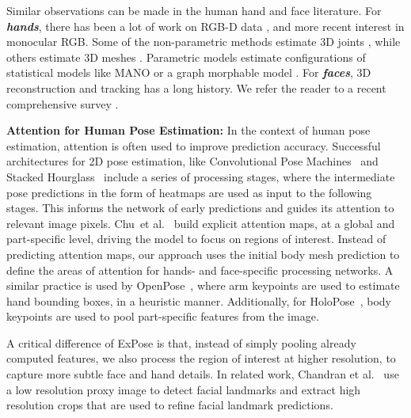\documentclass[runningheads]{llncs}
\newcommand{\modelname}{\mbox{ExPose}\xspace}
\newcommand{\mano}{\mbox{MANO}\xspace}
\newcommand{\threeD}{3D\xspace}
\newcommand{\etal}{et al.\xspace}
\newcommand{\rgb}{\mbox{RGB}\xspace}
\newcommand{\rgbD}{\mbox{RGB-D}\xspace}
\newcommand{\labelBODY}[1]{\xspace{\color{black} \textbf{\emph{#1}}}\xspace}
\begin{document}
Similar observations can be made in the human hand and face literature.
For \labelBODY{hands}, there has been a lot of work on \rgbD data
\cite{yuan2018depth}, and more recent interest in
monocular \rgb \cite{Baek_2019_CVPR,boukhayma_2019_cvpr,honnotate2020,hasson_2019_cvpr,Iqbal_2018_ECCV,kulon2019rec,Mueller_2018_GANerated,Tekin_2019_CVPR,brox_ICCV_2017}.
Some of the non-parametric methods estimate \threeD joints \cite{Iqbal_2018_ECCV,Mueller_2018_GANerated,Tekin_2019_CVPR,brox_ICCV_2017},
while others estimate \threeD meshes \cite{Ge_2019_CVPR,Kulon_2020_CVPR}.
Parametric models \cite{Baek_2019_CVPR,boukhayma_2019_cvpr,hasson_2019_cvpr,kulon2019rec,Zhang_2019_ICCV}
estimate configurations of statistical models like \mano \cite{romero2017embodied}
or a graph morphable model \cite{kulon2019rec}.
For \labelBODY{faces}, \threeD reconstruction and tracking
has a long history. We refer the reader to a recent comprehensive
survey \cite{zollhofer2018state}.


\textbf{Attention for Human Pose Estimation:}
In the context of human pose estimation,
attention is often used to improve
prediction accuracy.
Successful architectures for 2D pose estimation,
like Convolutional Pose Machines~\cite{wei2016convolutional}
and Stacked Hourglass~\cite{newell2016stacked}
include a series of processing stages,
where the intermediate pose predictions in the form of heatmaps
are used as input to the following stages.
This informs the network of early predictions
and guides its attention to relevant image pixels.
Chu~\etal~\cite{chu2017multi} build explicit attention maps,
at a global and part-specific level,
driving the model to focus on regions of interest.
Instead of predicting attention maps,
our approach uses the initial body mesh prediction
to define the areas of attention for hands- and face-specific
processing networks.
A similar practice is used by OpenPose~\cite{cao2018openpose},
where arm keypoints are used to estimate hand bounding boxes,
in a heuristic manner.
Additionally, for HoloPose~\cite{Guler_2019_CVPR},
body keypoints are used to pool
part-specific features from the image.

A critical difference of \modelname is that,
instead of simply pooling already
computed features,
we also process the region of interest
at  higher resolution, to capture
more subtle face and hand details.
In related work, Chandran \etal~\cite{Chandran_2020_CVPR} use a low resolution proxy image to
detect facial landmarks and extract high resolution crops that are
used to refine facial landmark predictions.
\end{document}
